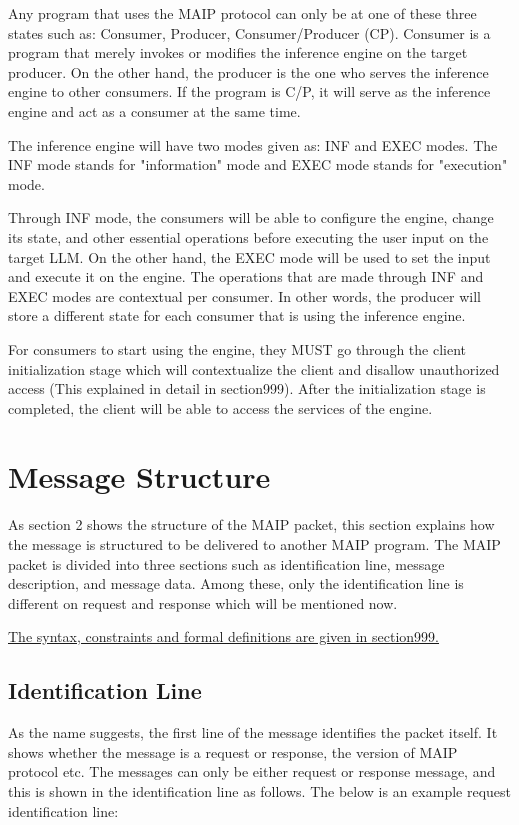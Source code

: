 \documentclass{article}
\begin{document}
Any program that uses the MAIP protocol can only be at one of these three states such as: Consumer, Producer, Consumer/Producer (CP). Consumer is a program that merely invokes or modifies the inference engine on the target producer. On the other hand, the producer is the one who serves the inference engine to other consumers. If the program is C/P, it will serve as the inference engine and act as a consumer at the same time. \newline

The inference engine will have two modes given as: INF and EXEC modes. The INF mode stands for "information" mode and EXEC mode stands for "execution" mode. \newline

Through INF mode, the consumers will be able to configure the engine, change its state, and other essential operations before executing the user input on the target LLM. On the other hand, the EXEC mode will be used to set the input and execute it on the engine. The operations that are made through INF and EXEC modes are contextual per consumer. In other words, the producer will store a different state for each consumer that is using the inference engine.\newline

For consumers to start using the engine, they MUST go through the client initialization stage which will contextualize the client and disallow unauthorized access (This explained in detail in section999). After the initialization stage is completed, the client will be able to access the services of the engine.\newline
\section{Message Structure}
As section 2 shows the structure of the MAIP packet, this section explains how the message is structured to be delivered to another MAIP program. The MAIP packet is divided into three sections such as identification line, message description, and message data. Among these, only the identification line is different on request and response which will be mentioned now.\newline

\underline{The syntax, constraints and formal definitions are given in section999.}
\subsection{Identification Line}
As the name suggests, the first line of the message identifies the packet itself. It shows whether the message is a request or response, the version of MAIP protocol etc. The messages can only be either request or response message, and this is shown in the identification line as follows. The below is an example request identification line:\newline
\end{document}
